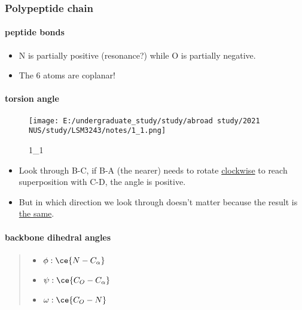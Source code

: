 \documentclass[]{article}
\let\oldparagraph\paragraph
\renewcommand{\paragraph}[1]{\oldparagraph{#1}\mbox{}}
\begin{document}
\hypertarget{polypeptide-chain}{%
\subsubsection{Polypeptide chain}\label{polypeptide-chain}}

\hypertarget{peptide-bonds}{%
\paragraph{peptide bonds}\label{peptide-bonds}}

\begin{itemize}
\item
  N is partially positive (resonance?) while O is partially negative.
\item
  The 6 atoms are coplanar!
\end{itemize}

\hypertarget{torsion-angle}{%
\paragraph{torsion angle}\label{torsion-angle}}

\begin{figure}
\centering
\texttt{[image: E:/undergraduate\_study/study/abroad study/2021 NUS/study/LSM3243/notes/1\_1.png]}
\caption{1\_1}
\end{figure}

\begin{itemize}
\item
  Look through B-C, if B-A (the nearer) needs to rotate
  \underline{clockwise} to reach superposition with C-D, the angle is
  positive.
\item
  But in which direction we look through doesn't matter because the
  result is \underline{the same}.
\end{itemize}

\hypertarget{backbone-dihedral-angles}{%
\paragraph{backbone dihedral angles}\label{backbone-dihedral-angles}}

\begin{quote}
\begin{itemize}
\item
  \(\phi : \ce{N-C_{\alpha}}\)
\item
  \(\psi : \ce{C_O-C_{\alpha}}\)
\item
  \(\omega : \ce{C_O-N}\)
\end{itemize}
\end{quote}
\end{document}
